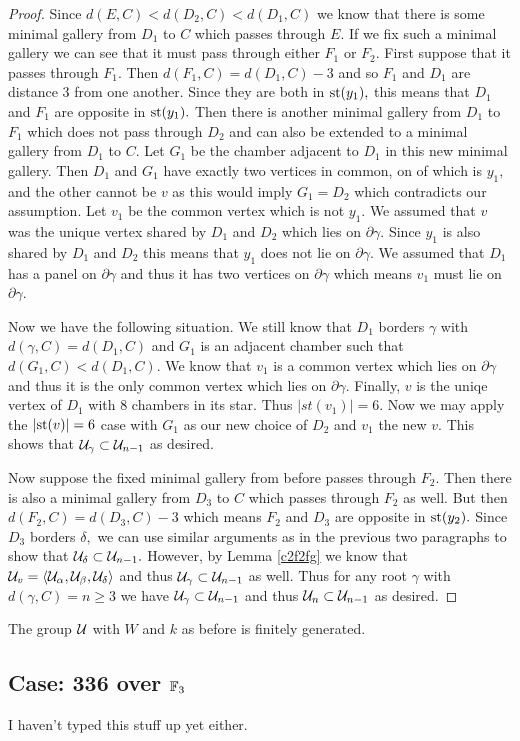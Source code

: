 \documentclass[class=book, crop=false]{standalone}
\begin{document}
\begin{proof}
Since $d(E,C)<d(D_2,C)<d(D_1,C)$ we know that there is some minimal gallery from $D_1$ to $C$ which passes through $E.$ If we fix such a minimal gallery we can see that it must pass through either $F_1$ or $F_2.$ First suppose that it passes through $F_1.$ Then $d(F_1,C)=d(D_1,C)-3$ and so $F_1$ and $D_1$ are distance 3 from one another. Since they are both in $\mathrm{st}(y_1),$ this means that $D_1$ and $F_1$ are opposite in $\mathrm{st}(y_1).$ Then there is another minimal gallery from $D_1$ to $F_1$ which does not pass through $D_2$ and can also be extended to a minimal gallery from $D_1$ to $C.$ Let $G_1$ be the chamber adjacent to $D_1$ in this new minimal gallery. Then $D_1$ and $G_1$ have exactly two vertices in common, on of which is $y_1,$ and the other cannot be $v$ as this would imply $G_1=D_2$ which contradicts our assumption. Let $v_1$ be the common vertex which is not $y_1.$ We assumed that $v$ was the unique vertex shared by $D_1$ and $D_2$ which lies on $\partial \gamma.$ Since $y_1$ is also shared by $D_1$ and $D_2$ this means that $y_1$ does not lie on $\partial \gamma.$ We assumed that $D_1$ has a panel on $\partial \gamma$ and thus it has two vertices on $\partial \gamma$ which means $v_1$ must lie on $\partial \gamma.$

Now we have the following situation. We still know that $D_1$ borders $\gamma$ with $d(\gamma,C)=d(D_1,C)$ and $G_1$ is an adjacent chamber such that $d(G_1,C)<d(D_1,C).$ We know that $v_1$ is a common vertex which lies on $\partial\gamma$ and thus it is the only common vertex which lies on $\partial\gamma.$ Finally, $v$ is the uniqe vertex of $D_1$ with 8 chambers in its star. Thus $|st(v_1)|=6.$ Now we may apply the $|\mathrm{st}(v)|=6$ case with $G_1$ as our new choice of $D_2$ and $v_1$ the new $v.$ This shows that $\mathcal{U}_\gamma\subset \mathcal{U}_{n-1}$ as desired.

Now suppose the fixed minimal gallery from before passes through $F_2.$ Then there is also a minimal gallery from $D_3$ to $C$ which passes through $F_2$ as well. But then $d(F_2,C)=d(D_3,C)-3$ which means $F_2$ and $D_3$ are opposite in $\mathrm{st}(y_2).$ Since $D_3$ borders $\delta,$ we can use similar arguments as in the previous two paragraphs to show that $\mathcal{U}_\delta\subset \mathcal{U}_{n-1}.$ However, by Lemma \ref{c2f2fg} we know that $\mathcal{U}_v=\langle \mathcal{U}_\alpha,\mathcal{U}_\beta,\mathcal{U}_\delta\rangle$ and thus $\mathcal{U}_\gamma\subset \mathcal{U}_{n-1}$ as well. Thus for any root $\gamma$ with $d(\gamma,C)=n\ge 3$ we have $\mathcal{U}_\gamma\subset \mathcal{U}_{n-1}$ and thus $\mathcal{U}_n\subset \mathcal{U}_{n-1}$ as desired.
\end{proof}

\begin{cor} The group $\mathcal{U}$ with $W$ and $k$ as before is finitely generated.\end{cor}

\subsection{Case: 336 over $\mathbb{F}_{3}$}
I haven't typed this stuff up yet either.
\end{document}
